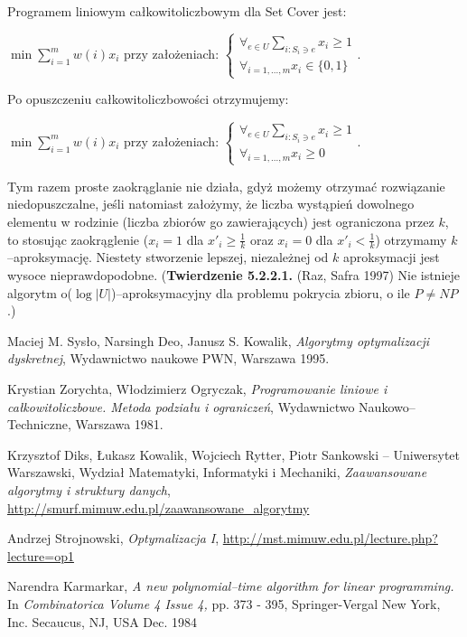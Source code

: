 \documentclass[licencjacka]{pracamgr}
\begin{document}
Programem liniowym całkowitoliczbowym dla Set Cover jest:\newline
\centerline{$\min\sum\limits_{i=1}^{m}w(i)x_i$ przy założeniach: 
$\left\{\begin{array}{c}
\forall_{e\in U}\sum\limits_{i:S_i\ni e}x_i\ge1\\
\forall_{i=1,...,m}x_i\in\{0,1\}
\end{array}\right.$.}\newline
Po opuszczeniu całkowitoliczbowości otrzymujemy:\newline
\centerline{$\min\sum\limits_{i=1}^{m}w(i)x_i$ przy założeniach: 
$\left\{\begin{array}{c}
\forall_{e\in U}\sum\limits_{i:S_i\ni e}x_i\ge1\\
\forall_{i=1,...,m}x_i\ge0
\end{array}\right.$.}

Tym razem proste zaokrąglanie nie działa, gdyż możemy otrzymać rozwiązanie niedopuszczalne, jeśli natomiast założymy, że liczba wystąpień dowolnego elementu w rodzinie
(liczba zbiorów go zawierających) jest ograniczona przez $k$, to stosując zaokrąglenie ($x_i=1$ dla $x'_i\ge\frac{1}{k}$ oraz $x_i=0$ dla $x'_i<\frac{1}{k}$)
otrzymamy $k$--aproksymację. Niestety stworzenie lepszej, niezależnej od $k$ aproksymacji jest wysoce nieprawdopodobne.\newline\newline
%
(\textbf{Twierdzenie 5.2.2.1.} (Raz, Safra 1997) Nie istnieje algorytm o($\log|U|$)--aproksymacyjny dla problemu pokrycia zbioru, o ile $P\neq NP$.)\newline
%
\begin{thebibliography}{99}

 Maciej M. Sysło, Narsingh Deo, Janusz S. Kowalik,
\textit{Algorytmy optymalizacji dyskretnej},
Wydawnictwo naukowe PWN, Warszawa 1995. 

 Krystian Zorychta, Włodzimierz Ogryczak,
\textit{Programowanie liniowe i całkowitoliczbowe. Metoda podziału i ograniczeń},
Wydawnictwo Naukowo--Techniczne, Warszawa 1981.

 Krzysztof Diks, Łukasz Kowalik, Wojciech Rytter, Piotr Sankowski -- Uniwersytet Warszawski, Wydział Matematyki, Informatyki i Mechaniki,
\textit{Zaawansowane algorytmy i struktury danych},
\url{http://smurf.mimuw.edu.pl/zaawansowane_algorytmy}

 Andrzej Strojnowski,
\textit{Optymalizacja I},\newline
\url{http://mst.mimuw.edu.pl/lecture.php?lecture=op1}


 Narendra Karmarkar,
\textit{A new polynomial--time algorithm for linear programming.}
In \textit{Combinatorica Volume 4 Issue 4,}
pp. 373 - 395,
Springer-Vergal New York, Inc. Secaucus, NJ, USA Dec. 1984






\end{thebibliography}
\end{document}
